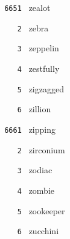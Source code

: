 \documentclass[11pt]{article}
\begin{document}
\begin{multicols}{6}
\noindent \texttt{ 6651 } zealot  \par
\noindent \texttt{ \ \ \ 2 } zebra  \par
\noindent \texttt{ \ \ \ 3 } zeppelin  \par
\noindent \texttt{ \ \ \ 4 } zestfully  \par
\noindent \texttt{ \ \ \ 5 } zigzagged  \par
\noindent \texttt{ \ \ \ 6 } zillion  \par
\vspace{3mm}
\noindent \texttt{ 6661 } zipping  \par
\noindent \texttt{ \ \ \ 2 } zirconium  \par
\noindent \texttt{ \ \ \ 3 } zodiac  \par
\noindent \texttt{ \ \ \ 4 } zombie  \par
\noindent \texttt{ \ \ \ 5 } zookeeper  \par
\noindent \texttt{ \ \ \ 6 } zucchini
\end{multicols}
\end{document}
